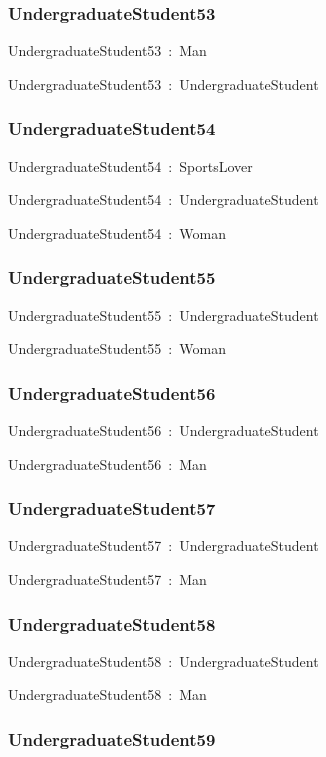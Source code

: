 \documentclass{article}
\begin{document}
\subsubsection*{UndergraduateStudent53}

UndergraduateStudent53~:~Man

UndergraduateStudent53~:~UndergraduateStudent

\subsubsection*{UndergraduateStudent54}

UndergraduateStudent54~:~SportsLover

UndergraduateStudent54~:~UndergraduateStudent

UndergraduateStudent54~:~Woman

\subsubsection*{UndergraduateStudent55}

UndergraduateStudent55~:~UndergraduateStudent

UndergraduateStudent55~:~Woman

\subsubsection*{UndergraduateStudent56}

UndergraduateStudent56~:~UndergraduateStudent

UndergraduateStudent56~:~Man

\subsubsection*{UndergraduateStudent57}

UndergraduateStudent57~:~UndergraduateStudent

UndergraduateStudent57~:~Man

\subsubsection*{UndergraduateStudent58}

UndergraduateStudent58~:~UndergraduateStudent

UndergraduateStudent58~:~Man

\subsubsection*{UndergraduateStudent59}
\end{document}
